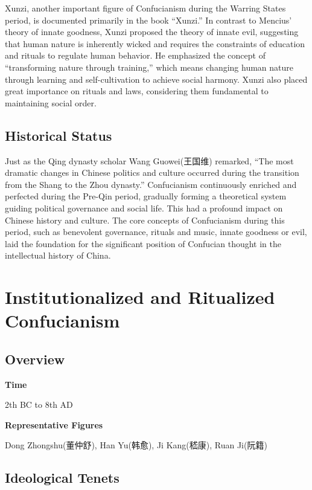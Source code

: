 \documentclass[
]{book}
\begin{document}
Xunzi, another important figure of Confucianism during the Warring States period, is documented primarily in the book ``Xunzi.'' In contrast to Mencius' theory of innate goodness, Xunzi proposed the theory of innate evil, suggesting that human nature is inherently wicked and requires the constraints of education and rituals to regulate human behavior. He emphasized the concept of ``transforming nature through training,'' which means changing human nature through learning and self-cultivation to achieve social harmony. Xunzi also placed great importance on rituals and laws, considering them fundamental to maintaining social order.

\hypertarget{historical-status}{%
\section{Historical Status}\label{historical-status}}

Just as the Qing dynasty scholar Wang Guowei(王国维) remarked, ``The most dramatic changes in Chinese politics and culture occurred during the transition from the Shang to the Zhou dynasty.'' Confucianism continuously enriched and perfected during the Pre-Qin period, gradually forming a theoretical system guiding political governance and social life. This had a profound impact on Chinese history and culture. The core concepts of Confucianism during this period, such as benevolent governance, rituals and music, innate goodness or evil, laid the foundation for the significant position of Confucian thought in the intellectual history of China.

\hypertarget{institutionalized-and-ritualized-confucianism}{%
\chapter{Institutionalized and Ritualized Confucianism}\label{institutionalized-and-ritualized-confucianism}}

\hypertarget{overview-1}{%
\section{Overview}\label{overview-1}}

\textbf{Time}

2th BC to 8th AD

\textbf{Representative Figures}

Dong Zhongshu(董仲舒), Han Yu(韩愈), Ji Kang(嵇康), Ruan Ji(阮籍)

\hypertarget{ideological-tenets-1}{%
\section{Ideological Tenets}\label{ideological-tenets-1}}
\end{document}
